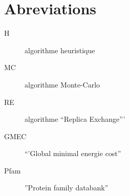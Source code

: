 \chapter*{Abreviations}

\begin{multicols}{2}

\begin{description}
\item[H] algorithme heuristique
\item[MC] algorithme Monte-Carlo
\item[RE] algorithme ``Replica Exchange'''
\item[GMEC] ``'Global minimal energie cost''
\item[Pfam] ''Protein family databank''
\end{description}

\end{multicols}

